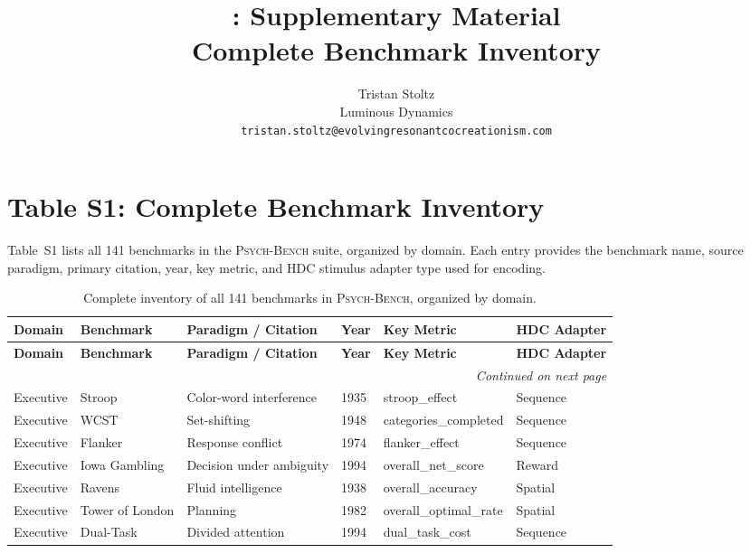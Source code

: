 \documentclass[10pt,landscape]{article}
\title{\psychbench{}: Supplementary Material\\
\large Complete Benchmark Inventory}
\author{Tristan Stoltz\\
Luminous Dynamics\\
\texttt{tristan.stoltz@evolvingresonantcocreationism.com}}
\date{}
\newcommand{\psychbench}{\textsc{Psych-Bench}}
\begin{document}
\maketitle

\section*{Table S1: Complete Benchmark Inventory}

Table~S1 lists all 141 benchmarks in the \psychbench{} suite, organized by domain. Each entry provides the benchmark name, source paradigm, primary citation, year, key metric, and HDC stimulus adapter type used for encoding.

\renewcommand{\arraystretch}{1.15}
\begin{longtable}{@{}p{2.3cm}p{3.0cm}p{4.5cm}p{0.6cm}p{3.8cm}p{1.8cm}@{}}
\caption{Complete inventory of all 141 benchmarks in \psychbench{}, organized by domain.} \label{tab:s1} \\
\toprule
\textbf{Domain} & \textbf{Benchmark} & \textbf{Paradigm / Citation} & \textbf{Year} & \textbf{Key Metric} & \textbf{HDC Adapter} \\
\midrule
\endfirsthead
\toprule
\textbf{Domain} & \textbf{Benchmark} & \textbf{Paradigm / Citation} & \textbf{Year} & \textbf{Key Metric} & \textbf{HDC Adapter} \\
\midrule
\endhead
\midrule
\multicolumn{6}{r}{\emph{Continued on next page}} \\
\endfoot
\bottomrule
\endlastfoot

Executive & Stroop & Color-word interference \citep{stroop1935interference} & 1935 & stroop\_effect & Sequence \\
Executive & WCST & Set-shifting \citep{berg1948simple} & 1948 & categories\_completed & Sequence \\
Executive & Flanker & Response conflict \citep{eriksen1974effects} & 1974 & flanker\_effect & Sequence \\
Executive & Iowa Gambling & Decision under ambiguity \citep{bechara1994insensitivity} & 1994 & overall\_net\_score & Reward \\
Executive & Ravens & Fluid intelligence \citep{raven1938progressive} & 1938 & overall\_accuracy & Spatial \\
Executive & Tower of London & Planning \citep{shallice1982specific} & 1982 & overall\_optimal\_rate & Spatial \\
Executive & Dual-Task & Divided attention \citep{pashler1994dual} & 1994 & dual\_task\_cost & Sequence \\


\end{longtable}
\end{document}
